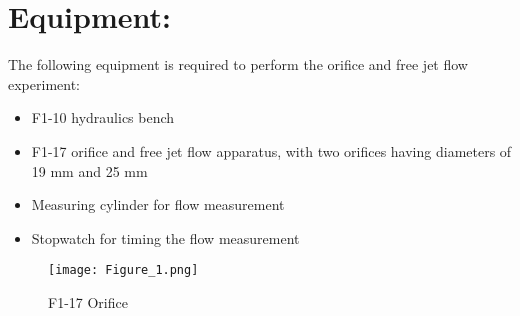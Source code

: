 \documentclass[12pt,a4paper]{article}
\begin{document}
\section{Equipment:}
The following equipment is required to perform the orifice and free jet flow experiment:
\begin{itemize}
\item F1-10 hydraulics bench
\item F1-17 orifice and free jet flow apparatus, with two orifices having diameters of 19 mm and 25 mm
\item Measuring cylinder for flow measurement
\item Stopwatch for timing the flow measurement
\end{itemize}
\begin{figure}[!ht]
	\begin{center}
			\texttt{[image: Figure\_1.png]}
	\end{center}
	\caption{F1-17 Orifice}
\end{figure}
\end{document}
